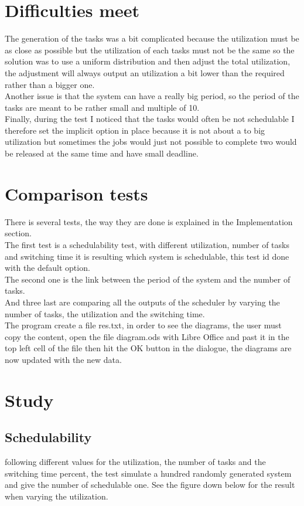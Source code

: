 \documentclass[a4paper,12pt]{article}
\begin{document}
\section{Difficulties meet}
The generation of the tasks was a bit complicated because the utilization must be as close as possible but the utilization of each tasks must not be the same so the solution was to use a uniform distribution and then adjust the total utilization, the adjustment will always output an utilization a bit lower than the required rather than a bigger one.\\
Another issue is that the system can have a really big period, so the period of the tasks are meant to be rather small and multiple of 10.\\
Finally, during the test I noticed that the tasks would often be not schedulable I therefore set the implicit option in place because it is not about a to big utilization but sometimes the jobs would just not possible to complete two would be released at the same time and have small deadline.

\section{Comparison tests}
There is several tests, the way they are done is explained in the Implementation section.\\
The first test is a schedulability test, with different utilization, number of tasks and switching time it is resulting which system is schedulable, this test id done with the default option.\\
The second one is the link between the period of the system and the number of tasks.\\
And three last are comparing all the outputs of the scheduler by varying the number of tasks, the utilization and the switching time.\\
The program create a file res.txt, in order to see the diagrams, the user must copy the content, open the file diagram.ods with Libre Office and past it in the top left cell of the file then hit the OK button in the dialogue, the diagrams are now updated with the new data.

\section{Study}
\subsection{Schedulability}
following different values for the utilization, the number of tasks and the switching time percent, the test simulate a hundred randomly generated system and give the number of schedulable one. See the figure down below for the result when varying the utilization.\\
\end{document}
